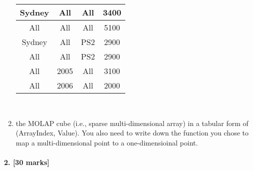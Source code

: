 \documentclass[a4paper]{scrartcl}
\begin{document}
\begin{enumerate}[label=\arabic*)]
\begin{tabular}{ c |c | c | c }
    \hline
    Sydney  & All  & All  & 3400 \\
    \hline
    All  & All  & All  & 5100 \\
    \hline
    Sydney  & All  & PS2  & 2900 \\
    \hline
    All  & All  & PS2  & 2900 \\
    \hline
    All  & 2005  & All  & 3100 \\
    \hline
    All  & 2006  & All  & 2000 \\
    \hline
\end{tabular}\\
\item the MOLAP cube (i.e., sparse multi-dimensional array) in a tabular form of  (ArrayIndex, Value). You also need to write down the function you chose to map a multi-dimensional point to a one-dimensioinal point.
\end{enumerate}
\paragraph{2. [30 marks]}
\label{sec:Question 2}
\end{document}
